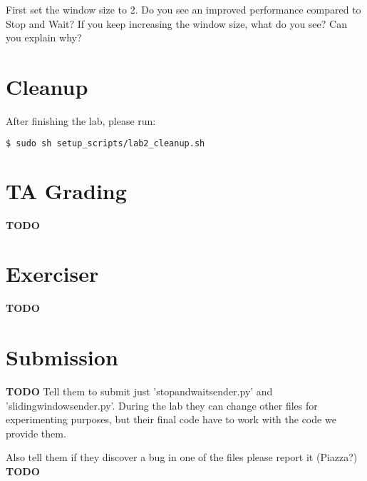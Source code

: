 \documentclass[11pt]{article}
\begin{document}
First set the window size to 2. Do you see an improved performance compared to Stop and Wait? If you keep increasing the window size, what do you see? Can you explain why?

\section{Cleanup}
After finishing the lab, please run:
\begin{lstlisting}[language=bash]
$ sudo sh setup_scripts/lab2_cleanup.sh
\end{lstlisting}

\section{TA Grading}
\label{sec:tagrading}
\textbf{TODO}

\section{Exerciser}
\label{sec:exercise}
\textbf{TODO}

\section{Submission}
\textbf{TODO}
Tell them to submit just 'stopandwaitsender.py' and 'slidingwindowsender.py'. During the lab they can change other files for experimenting purposes, but their final code have to work with the code we provide them.

Also tell them if they discover a bug in one of the files please report it (Piazza?)
\label{sec:submission}
\textbf{TODO}
\end{document}
